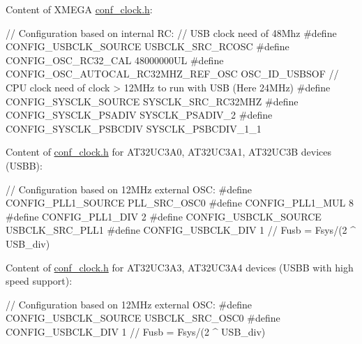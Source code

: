 Content of X\-M\-E\-G\-A \hyperlink{conf__clock_8h}{conf\-\_\-clock.\-h}\-: 
\begin{DoxyCode}
        \textcolor{comment}{// Configuration based on internal RC:}
        \textcolor{comment}{// USB clock need of 48Mhz}
\textcolor{preprocessor}{        #define CONFIG\_USBCLK\_SOURCE        USBCLK\_SRC\_RCOSC}
\textcolor{preprocessor}{}\textcolor{preprocessor}{        #define CONFIG\_OSC\_RC32\_CAL         48000000UL}
\textcolor{preprocessor}{}\textcolor{preprocessor}{        #define CONFIG\_OSC\_AUTOCAL\_RC32MHZ\_REF\_OSC  OSC\_ID\_USBSOF}
\textcolor{preprocessor}{}        \textcolor{comment}{// CPU clock need of clock > 12MHz to run with USB (Here 24MHz)}
\textcolor{preprocessor}{        #define CONFIG\_SYSCLK\_SOURCE     SYSCLK\_SRC\_RC32MHZ}
\textcolor{preprocessor}{}\textcolor{preprocessor}{        #define CONFIG\_SYSCLK\_PSADIV     SYSCLK\_PSADIV\_2}
\textcolor{preprocessor}{        #define CONFIG\_SYSCLK\_PSBCDIV    SYSCLK\_PSBCDIV\_1\_1}
\end{DoxyCode}


Content of \hyperlink{conf__clock_8h}{conf\-\_\-clock.\-h} for A\-T32\-U\-C3\-A0, A\-T32\-U\-C3\-A1, A\-T32\-U\-C3\-B devices (U\-S\-B\-B)\-: 
\begin{DoxyCode}
        \textcolor{comment}{// Configuration based on 12MHz external OSC:}
\textcolor{preprocessor}{        #define CONFIG\_PLL1\_SOURCE          PLL\_SRC\_OSC0}
\textcolor{preprocessor}{}\textcolor{preprocessor}{        #define CONFIG\_PLL1\_MUL             8}
\textcolor{preprocessor}{}\textcolor{preprocessor}{        #define CONFIG\_PLL1\_DIV             2}
\textcolor{preprocessor}{}\textcolor{preprocessor}{        #define CONFIG\_USBCLK\_SOURCE        USBCLK\_SRC\_PLL1}
\textcolor{preprocessor}{        #define CONFIG\_USBCLK\_DIV           1 // Fusb = Fsys/(2 ^ USB\_div)}
\end{DoxyCode}


Content of \hyperlink{conf__clock_8h}{conf\-\_\-clock.\-h} for A\-T32\-U\-C3\-A3, A\-T32\-U\-C3\-A4 devices (U\-S\-B\-B with high speed support)\-: 
\begin{DoxyCode}
        \textcolor{comment}{// Configuration based on 12MHz external OSC:}
\textcolor{preprocessor}{        #define CONFIG\_USBCLK\_SOURCE        USBCLK\_SRC\_OSC0}
\textcolor{preprocessor}{        #define CONFIG\_USBCLK\_DIV           1 // Fusb = Fsys/(2 ^ USB\_div)}
\end{DoxyCode}


